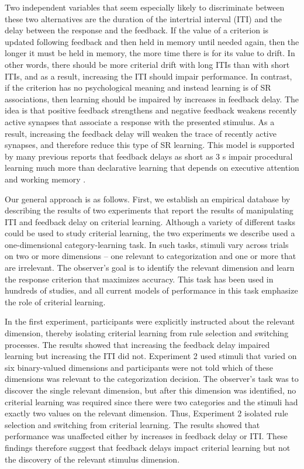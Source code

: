 \documentclass[doc, floatsintext]{apa7}
\begin{document}
Two independent variables that seem especially likely to
discriminate between these two alternatives are the duration
of the intertrial interval (ITI) and the delay between the
response and the feedback. If the value of a criterion is
updated following feedback and then held in memory until
needed again, then the longer it must be held in memory, the
more time there is for its value to drift. In other words,
there should be more criterial drift with long ITIs than
with short ITIs, and as a result, increasing the ITI should
impair performance. In contrast, if the criterion has no
psychological meaning and instead learning is of SR
associations, then learning should be impaired by increases
in feedback delay. The idea is that positive feedback
strengthens and negative feedback weakens recently active
synapses that associate a response with the presented
stimulus. As a result, increasing the feedback delay will
weaken the trace of recently active synapses, and therefore
reduce this type of SR learning. This model is supported by
many previous reports that feedback delays as short as 3 s
impair procedural learning much more than  declarative
learning that depends on executive attention and working
memory  \parencite{DunnEtAl2012, ell2009critrial,
MaddoxAshbyBohil2003, MaddoxIng2005,  Worthyetal2013}.

Our general approach is as follows. First, we establish an
empirical database by describing the results of two
experiments that report the results of manipulating ITI and
feedback delay on criterial learning. Although a variety of
different tasks could be used to study criterial learning,
the two experiments we describe used a one-dimensional
category-learning task. In such tasks, stimuli vary across
trials on two or more dimensions -- one relevant to
categorization and one or more that are irrelevant. The
observer's goal is to identify the relevant dimension and
learn the response criterion that maximizes accuracy. This
task has been used in hundreds of studies, and all current
models of performance in this task emphasize the role of
criterial learning.

In the first experiment, participants were explicitly
instructed about the relevant dimension, thereby isolating
criterial learning from rule selection and switching
processes. The results showed that increasing the feedback
delay impaired learning but increasing the ITI did not.
Experiment 2 used stimuli that varied on six binary-valued
dimensions and participants were not told which of these
dimensions was relevant to the categorization decision. The
observer's task was to discover the single relevant
dimension, but after this dimension was identified, no
criterial learning was required since there were two
categories and the stimuli had exactly two values on the
relevant dimension. Thus, Experiment 2 isolated rule
selection and switching from criterial learning. The results
showed that performance was unaffected either by increases
in feedback delay or ITI. These findings therefore suggest
that feedback delays impact criterial learning but not the
discovery of the relevant stimulus dimension. 
\end{document}
